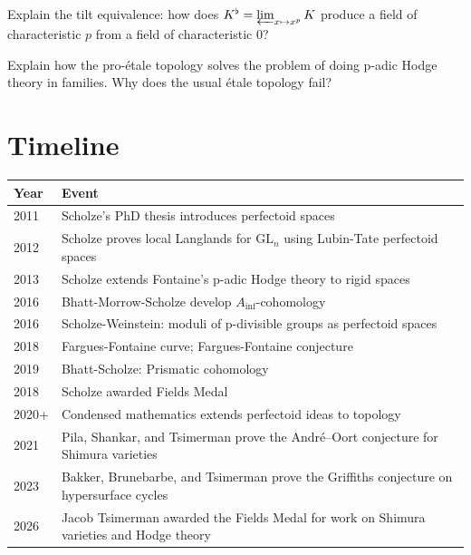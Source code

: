 \begin{exercise}[Intermediate]
Explain the tilt equivalence: how does $K^\flat = \varprojlim_{x \mapsto x^p} K$ produce a field of characteristic $p$ from a field of characteristic $0$?
\end{exercise}

\begin{exercise}[Challenge]
Explain how the pro-\'etale topology solves the problem of doing p-adic Hodge theory in families. Why does the usual \'etale topology fail?
\end{exercise}

\section{Timeline}

\begin{tabularx}{\linewidth}{lX}
\toprule
\textbf{Year} & \textbf{Event} \\ \midrule
2011 & Scholze's PhD thesis introduces perfectoid spaces \\ 
2012 & Scholze proves local Langlands for $\text{GL}_n$ using Lubin-Tate perfectoid spaces \\

2013 & Scholze extends Fontaine's p-adic Hodge theory to rigid spaces \\
2016 & Bhatt-Morrow-Scholze develop $A_{\text{inf}}$-cohomology \\

2016 & Scholze-Weinstein: moduli of p-divisible groups as perfectoid spaces \\

2018 & Fargues-Fontaine curve; Fargues-Fontaine conjecture \\

2019 & Bhatt-Scholze: Prismatic cohomology \\

2018 & Scholze awarded Fields Medal \\

2020+ & Condensed mathematics extends perfectoid ideas to topology \\
2021 & Pila, Shankar, and Tsimerman prove the Andr\'e--Oort conjecture for Shimura varieties \\
2023 & Bakker, Brunebarbe, and Tsimerman prove the Griffiths conjecture on hypersurface cycles \\
2026 & Jacob Tsimerman awarded the Fields Medal for work on Shimura varieties and Hodge theory \\
\bottomrule
\end{tabularx}


